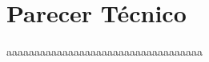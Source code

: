 \chapter{Parecer Técnico} \label{cha:parecertecnico}

aaaaaaaaaaaaaaaaaaaaaaaaaaaaaaaaaaa \textcite{abntex2modelo}